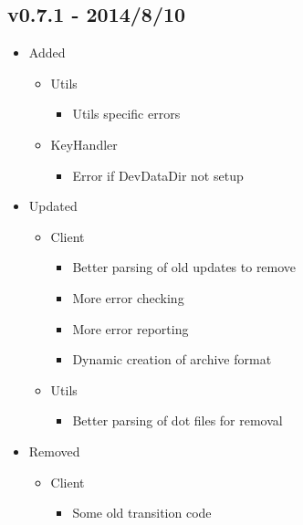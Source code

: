 \documentclass[letterpaper,10pt,english]{sphinxmanual}
\begin{document}
\subsection{v0.7.1 - 2014/8/10}
\label{release_history:v0-7-1-2014-8-10}\begin{itemize}
\item {} 
Added
\begin{itemize}
\item {} 
Utils
\begin{itemize}
\item {} 
Utils specific errors

\end{itemize}

\item {} 
KeyHandler
\begin{itemize}
\item {} 
Error if DevDataDir not setup

\end{itemize}

\end{itemize}

\item {} 
Updated
\begin{itemize}
\item {} 
Client
\begin{itemize}
\item {} 
Better parsing of old updates to remove

\item {} 
More error checking

\item {} 
More error reporting

\item {} 
Dynamic creation of archive format

\end{itemize}

\item {} 
Utils
\begin{itemize}
\item {} 
Better parsing of dot files for removal

\end{itemize}

\end{itemize}

\item {} 
Removed
\begin{itemize}
\item {} 
Client
\begin{itemize}
\item {} 
Some old transition code

\end{itemize}

\end{itemize}

\end{itemize}
\end{document}
